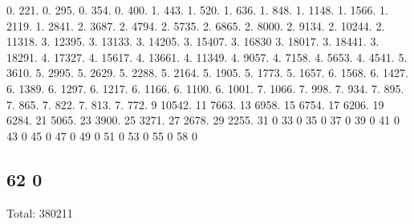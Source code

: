 0. 221. 0. 295. 0. 354. 0. 400. 1. 443. 1. 520. 1. 636. 1. 848. 1. 1148. 1. 1566. 1. 2119. 1. 2841. 2. 3687. 2. 4794. 2. 5735. 2. 6865. 2. 8000. 2. 9134. 2. 10244. 2. 11318. 3. 12395. 3. 13133. 3. 14205. 3. 15407. 3. 16830 3. 18017. 3. 18441. 3. 18291. 4. 17327. 4. 15617. 4. 13661. 4. 11349. 4. 9057. 4. 7158. 4. 5653. 4. 4541. 5. 3610. 5. 2995. 5. 2629. 5. 2288. 5. 2164. 5. 1905. 5. 1773. 5. 1657. 6. 1568. 6. 1427. 6. 1389. 6. 1297. 6. 1217. 6. 1166. 6. 1100. 6. 1001. 7. 1066. 7. 998. 7. 934. 7. 895. 7. 865. 7. 822. 7. 813. 7. 772. 9 10542. 11 7663. 13 6958. 15 6754. 17 6206. 19 6284. 21 5065. 23 3900. 25 3271. 27 2678. 29 2255. 31 0 33 0 35 0 37 0 39 0 41 0 43 0 45 0 47 0 49 0 51 0 53 0 55 0 58 0 \subsection*{62 0 }

Total\+: 380211 